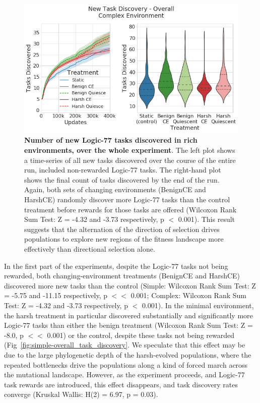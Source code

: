 \documentclass[PhD]{msu-thesis}
\begin{document}
	\begin{figure}[!h]
	\includegraphics[width=0.95\columnwidth]{figures/LTE/lte-complex-overall_task_discovery.png}
	\caption{\textbf{Number of new Logic-77 tasks discovered in rich environments, over the whole experiment}. The left plot shows a time-series of all new tasks discovered over the course of the entire run, included non-rewarded Logic-77 tasks. The right-hand plot shows the final count of tasks discovered by the end of the run. Again, both sets of changing environments (BenignCE and HarshCE) randomly discover more Logic-77 tasks than the control treatment before rewards for those tasks are offered (Wilcoxon Rank Sum Test: Z = -4.32 and -3.73 respectively, p $<$ 0.001). This result suggests that the alternation of the direction of selection drives populations to explore new regions of the fitness landscape more effectively than directional selection alone.%
	}
	\label{fig:complex-overall_task_discovery}
	\end{figure}
In the first part of the experiments, despite the Logic-77 tasks not being rewarded, both changing-environment treatments (BenignCE and HarshCE) discovered more new tasks than the control (Simple: Wilcoxon Rank Sum Test: Z = -5.75 and -11.15 respectively, p $<<$ 0.001; Complex: Wilcoxon Rank Sum Test: Z = -4.32 and -3.73 respectively, p $<$ 0.001). In the minimal environment, the harsh treatment in particular discovered substantially and significantly more Logic-77 tasks than either the benign treatment (Wilcoxon Rank Sum Test: Z = -8.0, p $<<$ 0.001) or the control, despite these tasks not being rewarded (Fig~\ref{fig:simple-overall_task_discovery}. We speculate that this effect may be due to the large phylogenetic depth of the harsh-evolved populations, where the repeated bottlenecks drive the populations along a kind of forced march across the mutational landscape. However, as the experiment proceeds, and Logic-77 task rewards are introduced, this effect disappears, and task discovery rates converge (Kruskal Wallis: H(2) = 6.97, p = 0.03).
\end{document}
